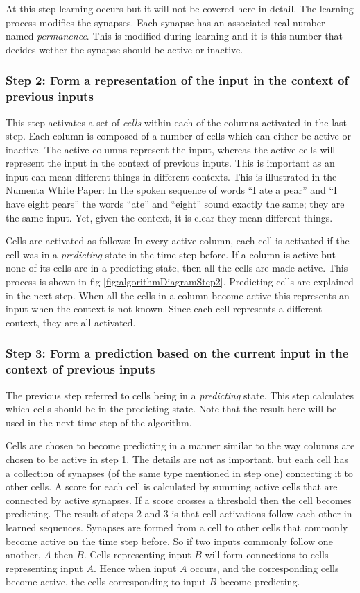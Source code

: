 \documentclass[a4paper]{jpconf}
\begin{document}
			At this step learning occurs but it will not be covered here in detail. The learning process modifies the synapses. Each synapse has an associated real number named \emph{permanence}. This is modified during learning and it is this number that decides wether the synapse should be active or inactive.

		\subsubsection{Step 2: Form a representation of the input in the context of previous inputs}
			This step activates a set of \emph{cells} within each of the columns activated in the last step. Each column is composed of a number of cells which can either be active or inactive. The active columns represent the input, whereas the active cells will represent the input in the context of previous inputs. This is important as an input can mean different things in different contexts. This is illustrated in the Numenta White Paper: In the spoken sequence of words ``I ate a pear'' and ``I have eight pears'' the words ``ate'' and ``eight'' sound exactly the same; they are the same input. Yet, given the context, it is clear they mean different things.
			
			Cells are activated as follows: In every active column, each cell is activated if the cell was in a \emph{predicting} state in the time step before. If a column is active but none of its cells are in a predicting state, then all the cells are made active. This process is shown in fig \ref{fig:algorithmDiagramStep2}. Predicting cells are explained in the next step. When all the cells in a column become active this represents an input when the context is not known. Since each cell represents a different context, they are all activated.
			
		\subsubsection{Step 3: Form a prediction based on the current input in the context of previous inputs}\label{step3}
		The previous step referred to cells being in a \emph{predicting} state. This step calculates which cells should be in the predicting state. Note that the result here will be used in the next time step of the algorithm.
		
		Cells are chosen to become predicting in a manner similar to the way columns are chosen to be active in step 1. The details are not as important, but each cell has a collection of synapses (of the same type mentioned in step one) connecting it to other cells. A score for each cell is calculated by summing active cells that are connected by active synapses. If a score crosses a threshold then the cell becomes predicting. The result of steps 2 and 3 is that cell activations follow each other in learned sequences. Synapses are formed from a cell to other cells that commonly become active on the time step before. So if two inputs commonly follow one another, $A$ then $B$. Cells representing input $B$ will form connections to cells representing input $A$. Hence when input $A$ occurs, and the corresponding cells become active, the cells corresponding to input $B$ become predicting.
		
\end{document}
